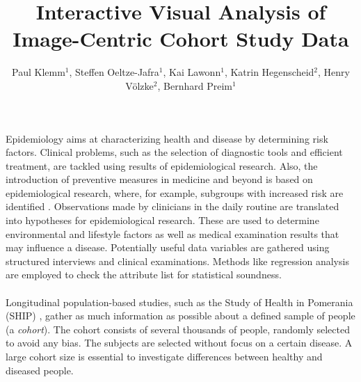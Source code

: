 \documentclass[journal]{style/vgtc} 			          %
\title{Interactive Visual Analysis of Image-Centric Cohort Study Data}
\author{Paul Klemm$^{1}$, Steffen Oeltze-Jafra$^{1}$, Kai Lawonn$^{1}$, Katrin Hegenscheid$^{2}$, Henry V{\"o}lzke$^{2}$, Bernhard Preim$^{1}$}
\begin{document}


\maketitle
Epidemiology aims at characterizing health and disease by determining risk factors.
%
Clinical problems, such as the selection of diagnostic tools and efficient treatment, are tackled using results of epidemiological research.
%
Also, the introduction of preventive measures in medicine and beyond is based on epidemiological research, where, for example, subgroups with increased risk are identified \cite{Fletcher2012}.
%
Observations made by clinicians in the daily routine are translated into hypotheses for epidemiological research.
%
These are used to determine environmental and lifestyle factors as well as medical examination results that may influence a disease.
%
Potentially useful data variables are gathered using structured interviews and clinical examinations.
%
Methods like regression analysis are employed to check the attribute list for statistical soundness.
%
\\\\
Longitudinal population-based studies, such as the Study of Health in Pomerania (SHIP) \cite{Volzke2011}, gather as much information as possible about a defined sample of people (a \emph{cohort}).
%
The cohort consists of several thousands of people, randomly selected to avoid any bias.
%
The subjects are selected without focus on a certain disease.
%
A large cohort size is essential to investigate differences between healthy and diseased people.
%
\end{document}
